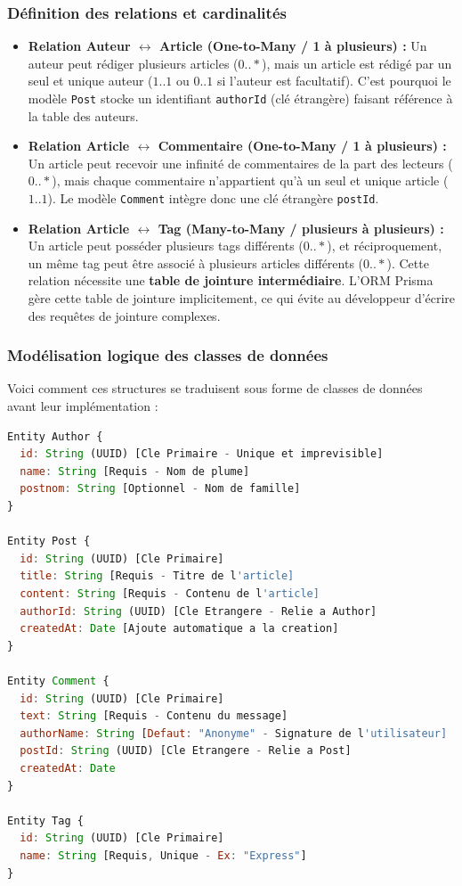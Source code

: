\subsubsection{Définition des relations et cardinalités}
\begin{itemize}
    \item \textbf{Relation Auteur $\leftrightarrow$ Article (One-to-Many / 1 à plusieurs) :}
    Un auteur peut rédiger plusieurs articles ($0..*$), mais un article est rédigé par un seul et unique auteur ($1..1$ ou $0..1$ si l'auteur est facultatif). C'est pourquoi le modèle \texttt{Post} stocke un identifiant \texttt{authorId} (clé étrangère) faisant référence à la table des auteurs.

    \item \textbf{Relation Article $\leftrightarrow$ Commentaire (One-to-Many / 1 à plusieurs) :}
    Un article peut recevoir une infinité de commentaires de la part des lecteurs ($0..*$), mais chaque commentaire n'appartient qu'à un seul et unique article ($1..1$). Le modèle \texttt{Comment} intègre donc une clé étrangère \texttt{postId}.

    \item \textbf{Relation Article $\leftrightarrow$ Tag (Many-to-Many / plusieurs à plusieurs) :}
    Un article peut posséder plusieurs tags différents ($0..*$), et réciproquement, un même tag peut être associé à plusieurs articles différents ($0..*$). Cette relation nécessite une \textbf{table de jointure intermédiaire}. L'ORM Prisma gère cette table de jointure implicitement, ce qui évite au développeur d'écrire des requêtes de jointure complexes.
\end{itemize}

\subsubsection{Modélisation logique des classes de données}
Voici comment ces structures se traduisent sous forme de classes de données avant leur implémentation :
\begin{lstlisting}[language=JavaScript]
Entity Author {
  id: String (UUID) [Cle Primaire - Unique et imprevisible]
  name: String [Requis - Nom de plume]
  postnom: String [Optionnel - Nom de famille]
}

Entity Post {
  id: String (UUID) [Cle Primaire]
  title: String [Requis - Titre de l'article]
  content: String [Requis - Contenu de l'article]
  authorId: String (UUID) [Cle Etrangere - Relie a Author]
  createdAt: Date [Ajoute automatique a la creation]
}

Entity Comment {
  id: String (UUID) [Cle Primaire]
  text: String [Requis - Contenu du message]
  authorName: String [Defaut: "Anonyme" - Signature de l'utilisateur]
  postId: String (UUID) [Cle Etrangere - Relie a Post]
  createdAt: Date
}

Entity Tag {
  id: String (UUID) [Cle Primaire]
  name: String [Requis, Unique - Ex: "Express"]
}
\end{lstlisting}

